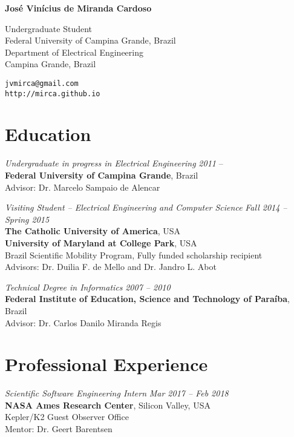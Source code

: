 \documentclass[10pt]{article}
\begin{document}
\pagestyle{empty}
\begin{titlepage}
     {\Large{\textbf{Jos\'e Vin\'icius de Miranda Cardoso}}}
     \vspace{.5cm}

    \begin{minipage}[b]{8cm}
     Undergraduate Student\\
     Federal University of Campina Grande, Brazil\\
     Department of Electrical Engineering\\
     Campina Grande, Brazil
    \end{minipage}
    \hfill
    \begin{minipage}[b]{4cm}
        \hfill \texttt{jvmirca@gmail.com}\\
        \texttt{http://mirca.github.io}
    \end{minipage}


\section*{Education}

\emph{Undergraduate in progress in Electrical Engineering} \hfill \textit{2011} --\\
\textbf{Federal University of Campina Grande}, Brazil\\
Advisor: Dr. Marcelo Sampaio de Alencar
\vspace{.5cm}

\emph{Visiting Student -- Electrical Engineering and Computer Science} \hfill \textit{Fall 2014 -- Spring 2015} \\
\textbf{The Catholic University of America}, USA\\
\textbf{University of Maryland at College Park}, USA \\
Brazil Scientific Mobility Program, Fully funded scholarship recipient \\
Advisors: Dr. Duilia F. de Mello and Dr. Jandro L. Abot
\vspace{.5cm}

\emph{Technical Degree in Informatics} \hfill \textit{2007 -- 2010}\\
\textbf{Federal Institute of Education, Science and Technology of Para\'iba}, Brazil \\
Advisor: Dr. Carlos Danilo Miranda Regis

\section*{Professional Experience}
\emph{Scientific Software Engineering Intern} \hfill \textit{Mar 2017 -- Feb 2018}
\\\textbf{NASA Ames Research Center}, Silicon Valley, USA
\\Kepler/K2 Guest Observer Office
\\Mentor: Dr. Geert Barentsen
\vspace{.5cm}


\end{titlepage}
\end{document}
